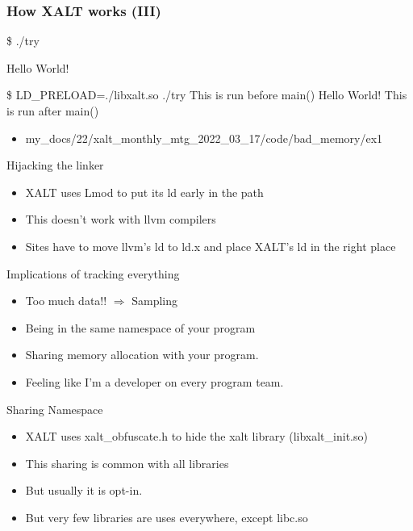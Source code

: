 \documentclass{beamer}
\begin{document}
\begin{frame}[fragile]
    \frametitle{How XALT works (III)}
 {\small
    \begin{semiverbatim}
\$ ./try

Hello World!

\$ LD\_PRELOAD=./libxalt.so  ./try
This is run before main()
Hello World!
This is run after main()
    \end{semiverbatim}
}
  \begin{itemize}
    \item my\_docs/22/xalt\_monthly\_mtg\_2022\_03\_17/code/bad\_memory/ex1
  \end{itemize}

\end{frame}

\begin{frame}{Hijacking the linker}
  \begin{itemize}
    \item XALT uses Lmod to put its ld early in the path
    \item This doesn't work with llvm compilers
    \item Sites have to move llvm's ld to ld.x and place XALT's ld in
      the right place
  \end{itemize}
\end{frame}

\begin{frame}{Implications of tracking everything}
  \begin{itemize}
    \item Too much data!! $\Rightarrow$ Sampling
    \item Being in the same namespace of your program
    \item Sharing memory allocation with your program.
    \item Feeling like I'm a developer on every program team.
  \end{itemize}
\end{frame}

\begin{frame}{Sharing Namespace}
  \begin{itemize}
    \item XALT uses xalt\_obfuscate.h to hide the xalt library
      (libxalt\_init.so)
    \item This sharing is common with all libraries
    \item But usually it is opt-in.
    \item But very few libraries are uses everywhere, except libc.so
  \end{itemize}
\end{frame}
\end{document}
